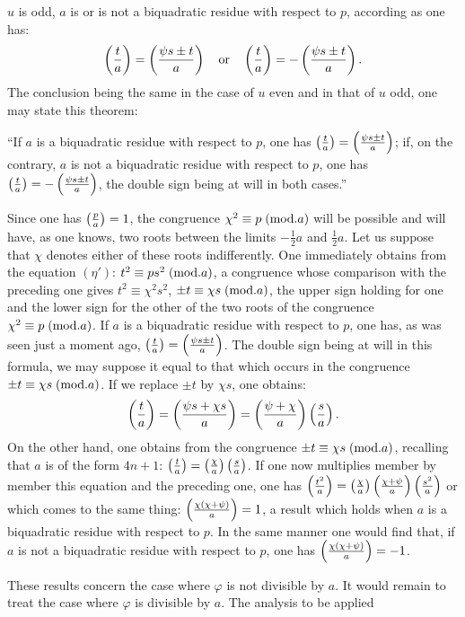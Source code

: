 \noindent
$u$ is odd, $a$ is or is not a biquadratic residue with respect to $p$, according
as one has:
\[
\left(\frac{t}{a}\right)=\left(\frac{\psi s\pm t}{a}\right)\quad\text{or}\quad
\left(\frac{t}{a}\right)=-\left(\frac{\psi s\pm t}{a}\right).
\]
The conclusion being the same in the case of $u$ even and in that of $u$ odd,
one may state this theorem:
\par\indent
“If $a$ is a biquadratic residue with respect to $p$, one has $\left(\frac{t}{a}\right)=\left(\frac{\psi s\pm t}{a}\right)$;
if, on the contrary, $a$ is not a biquadratic residue with respect to $p$, one has
$\left(\frac{t}{a}\right)=-\left(\frac{\psi s\pm t}{a}\right)$, the double sign being at will in both cases.”
\par\indent
Since one has $\left(\frac{p}{a}\right)=1$, the congruence $\chi^2\equiv p\;(\mathrm{mod}.a)$ will be possible and
will have, as one knows, two roots between the limits $-\frac12a$ and $\frac12a$. Let us suppose
that $\chi$ denotes either of these roots indifferently. One immediately obtains
from the equation $(\eta')$: $t^2\equiv ps^2\;(\mathrm{mod}.a)$, a congruence whose comparison
with the preceding one gives $t^2\equiv\chi^2s^2$, $\pm t\equiv\chi s\;(\mathrm{mod}.a)$, the upper sign holding
for one and the lower sign for the other of the two roots of the congruence
$\chi^2\equiv p\;(\mathrm{mod}.a)$. If $a$ is a biquadratic residue with respect to $p$, one
has, as was seen just a moment ago, $\left(\frac{t}{a}\right)=\left(\frac{\psi s\pm t}{a}\right)$. The double sign
being at will in this formula, we may suppose it equal to that which
occurs in the congruence $\pm t\equiv\chi s\;(\mathrm{mod}.a)$. If we replace $\pm t$ by
$\chi s$, one obtains:
\[
\left(\frac{t}{a}\right)=\left(\frac{\psi s+\chi s}{a}\right)=\left(\frac{\psi+\chi}{a}\right)\left(\frac{s}{a}\right).
\]
On the other hand, one obtains from the congruence $\pm t\equiv\chi s\;(\mathrm{mod}.a)$, recalling
that $a$ is of the form $4n+1$: $\left(\frac{t}{a}\right)=\left(\frac{\chi}{a}\right)\left(\frac{s}{a}\right)$. If one now multiplies
member by member this equation and the preceding one, one has $\left(\frac{t^2}{a}\right)=\left(\frac{\chi}{a}\right)\left(\frac{\chi+\psi}{a}\right)\left(\frac{s^2}{a}\right)$
or which comes to the same thing: $\left(\frac{\chi(\chi+\psi)}{a}\right)=1$, a result which holds when $a$ is
a biquadratic residue with respect to $p$. In the same manner one would find
that, if $a$ is not a biquadratic residue with respect to $p$, one has $\left(\frac{\chi(\chi+\psi)}{a}\right)=-1$.
\par\indent
These results concern the case where $\varphi$ is not divisible by $a$. It would remain
to treat the case where $\varphi$ is divisible by $a$. The analysis to be applied
